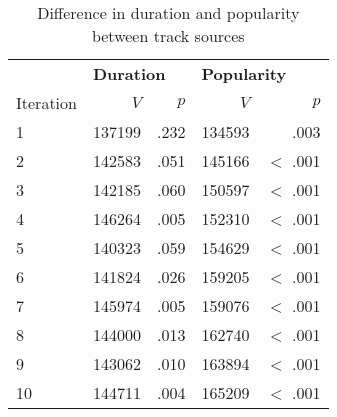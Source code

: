 \begin{table}[h]
\centering
\small

\begin{threeparttable}
\caption{Difference in duration and popularity between track sources}
\label{tab:val-2}

\begin{tabular*}{\textwidth}{@{\extracolsep{\fill}}lrrrr@{}}

\toprule & 
\multicolumn{2}{l}{\textbf{Duration}} & \multicolumn{2}{l}{\textbf{Popularity}} \\ 
\cmidrule{2-5}

Iteration & $V$                & $p$              & $V$               & $p$                 \\ 
\midrule

1         & 137199             & .232             & 134593            & .003                \\
2         & 142583             & .051             & 145166            & $<$ .001            \\
3         & 142185             & .060             & 150597            & $<$ .001            \\
4         & 146264             & .005             & 152310            & $<$ .001            \\
5         & 140323             & .059             & 154629            & $<$ .001            \\
6         & 141824             & .026             & 159205            & $<$ .001            \\
7         & 145974             & .005             & 159076            & $<$ .001            \\
8         & 144000             & .013             & 162740            & $<$ .001            \\
9         & 143062             & .010             & 163894            & $<$ .001            \\
10        & 144711             & .004             & 165209            & $<$ .001            \\ 
\bottomrule

\end{tabular*}
\end{threeparttable}
\end{table}